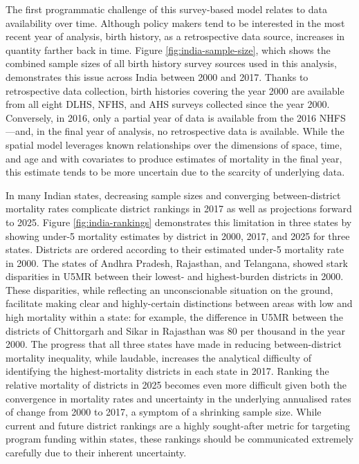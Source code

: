 \documentclass[
]{report}
\begin{document}
The first programmatic challenge of this survey-based model relates to data availability over time. Although policy makers tend to be interested in the most recent year of analysis, birth history, as a retrospective data source, increases in quantity farther back in time. Figure \ref{fig:india-sample-size}, which shows the combined sample sizes of all birth history survey sources used in this analysis, demonstrates this issue across India between 2000 and 2017. Thanks to retrospective data collection, birth histories covering the year 2000 are available from all eight DLHS, NFHS, and AHS surveys collected since the year 2000. Conversely, in 2016, only a partial year of data is available from the 2016 NHFS---and, in the final year of analysis, no retrospective data is available. While the spatial model leverages known relationships over the dimensions of space, time, and age and with covariates to produce estimates of mortality in the final year, this estimate tends to be more uncertain due to the scarcity of underlying data.

In many Indian states, decreasing sample sizes and converging between-district mortality rates complicate district rankings in 2017 as well as projections forward to 2025. Figure \ref{fig:india-rankings} demonstrates this limitation in three states by showing under-5 mortality estimates by district in 2000, 2017, and 2025 for three states. Districts are ordered according to their estimated under-5 mortality rate in 2000. The states of Andhra Pradesh, Rajasthan, and Telangana, showed stark disparities in U5MR between their lowest- and highest-burden districts in 2000. These disparities, while reflecting an unconscionable situation on the ground, facilitate making clear and highly-certain distinctions between areas with low and high mortality within a state: for example, the difference in U5MR between the districts of Chittorgarh and Sikar in Rajasthan was 80 per thousand in the year 2000. The progress that all three states have made in reducing between-district mortality inequality, while laudable, increases the analytical difficulty of identifying the highest-mortality districts in each state in 2017. Ranking the relative mortality of districts in 2025 becomes even more difficult given both the convergence in mortality rates and uncertainty in the underlying annualised rates of change from 2000 to 2017, a symptom of a shrinking sample size. While current and future district rankings are a highly sought-after metric for targeting program funding within states, these rankings should be communicated extremely carefully due to their inherent uncertainty.
\end{document}
